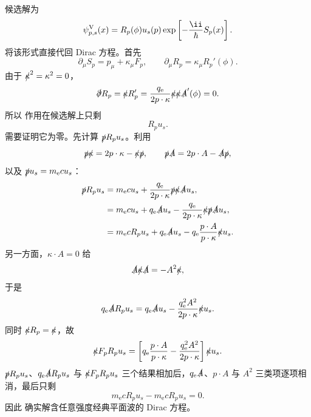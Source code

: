 \begin{derivation}
候选解为
\begin{equation*}
 {
 \psi_{p,s}^{\rm V}(x)
 =R_p(\phi)u_s(p)
 \exp\left[-\frac{\ii}{\hbar}S_p(x)\right].}
 \end{equation*}
将该形式直接代回 Dirac 方程。首先
\begin{equation*}
 \partial_\mu S_p=p_\mu+\kappa_\mu F_p,
 \qquad
 \partial_\mu R_p=\kappa_\mu R_p'(\phi).
\end{equation*}
由于 $\slashed\kappa^2=\kappa^2=0$，
\begin{equation*}
 \slashed\partial R_p
 =\slashed\kappa R_p'
 =\frac{q_{\mathrm e}}{2p\cdot\kappa}
 \slashed\kappa\slashed\kappa\slashed A'(\phi)
 =0.
 \end{equation*}
所以 作用在候选解上只剩
\begin{equation*}
 [\slashed p+\slashed\kappa F_p-q_{\mathrm e}\slashed A-m_{\mathrm e} c]R_pu_s.
 \end{equation*}
需要证明它为零。先计算 $\slashed pR_pu_s$。利用
\begin{equation*}
 \slashed p\slashed\kappa=2p\cdot\kappa-\slashed\kappa\slashed p,
 \qquad
 \slashed p\slashed A=2p\cdot A-\slashed A\slashed p,
\end{equation*}
以及 $\slashed p u_s=m_{\mathrm e} cu_s$：
\begin{align*}
 \slashed pR_pu_s
 &=m_{\mathrm e} cu_s+\frac{q_{\mathrm e}}{2p\cdot\kappa}
 \slashed p\slashed\kappa\slashed A u_s,\\
 &=m_{\mathrm e} cu_s+q_{\mathrm e}\slashed A u_s
 -\frac{q_{\mathrm e}}{2p\cdot\kappa}
 \slashed\kappa\slashed p\slashed A u_s,\\
 &=m_{\mathrm e} cR_pu_s+q_{\mathrm e}\slashed A u_s
 -q_{\mathrm e}\frac{p\cdot A}{p\cdot\kappa}\slashed\kappa u_s.
 \end{align*}
另一方面，$\kappa\cdot A=0$ 给
\begin{equation*}
 \slashed A\slashed\kappa\slashed A
 =-A^2\slashed\kappa,
\end{equation*}
于是
\begin{equation*}
 q_{\mathrm e}\slashed A R_pu_s
 =q_{\mathrm e}\slashed A u_s
 -\frac{q_{\mathrm e}^2A^2}{2p\cdot\kappa}\slashed\kappa u_s.
 \end{equation*}
同时 $\slashed\kappa R_p=\slashed\kappa$，故
\begin{equation*}
 \slashed\kappa F_p R_pu_s
 =\left[
 q_{\mathrm e}\frac{p\cdot A}{p\cdot\kappa}
 -\frac{q_{\mathrm e}^2A^2}{2p\cdot\kappa}
 \right]\slashed\kappa u_s.
 \end{equation*}
$\slashed pR_pu_s$、$q_{\mathrm e}\slashed A R_pu_s$ 与 $\slashed\kappa F_pR_pu_s$ 三个结果相加后，$q_{\mathrm e}\slashed A$、$p\cdot A$ 与 $A^2$ 三类项逐项相消，最后只剩
\begin{equation*}
 m_{\mathrm e} cR_pu_s-m_{\mathrm e} cR_pu_s=0.
\end{equation*}
因此  确实解含任意强度经典平面波的 Dirac 方程。


\end{derivation}
